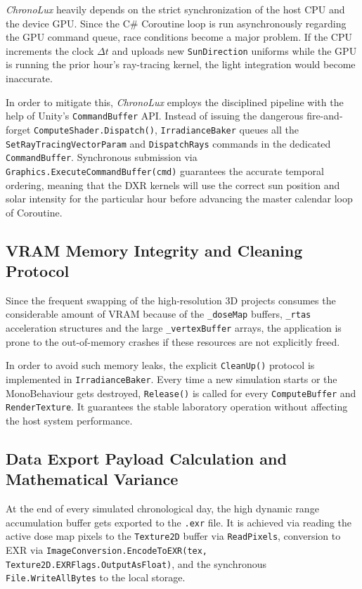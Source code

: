 \textit{ChronoLux} heavily depends on the strict synchronization of the host CPU and the device GPU. Since the C\# Coroutine loop is run asynchronously regarding the GPU command queue, race conditions become a major problem. If the CPU increments the clock $\Delta t$ and uploads new \texttt{SunDirection} uniforms while the GPU is running the prior hour's ray-tracing kernel, the light integration would become inaccurate.

In order to mitigate this, \textit{ChronoLux} employs the disciplined pipeline with the help of Unity's \texttt{CommandBuffer} API. Instead of issuing the dangerous fire-and-forget \texttt{ComputeShader.Dispatch()}, \texttt{IrradianceBaker} queues all the \texttt{SetRayTracingVectorParam} and \texttt{DispatchRays} commands in the dedicated \texttt{CommandBuffer}. Synchronous submission via \texttt{Graphics.ExecuteCommandBuffer(cmd)} guarantees the accurate temporal ordering, meaning that the DXR kernels will use the correct sun position and solar intensity for the particular hour before advancing the master calendar loop of Coroutine.

\subsection{VRAM Memory Integrity and Cleaning Protocol}

Since the frequent swapping of the high-resolution 3D projects consumes the considerable amount of VRAM because of the \texttt{\_doseMap} buffers, \texttt{\_rtas} acceleration structures and the large \texttt{\_vertexBuffer} arrays, the application is prone to the out-of-memory crashes if these resources are not explicitly freed.

In order to avoid such memory leaks, the explicit \texttt{CleanUp()} protocol is implemented in \texttt{IrradianceBaker}. Every time a new simulation starts or the MonoBehaviour gets destroyed, \texttt{Release()} is called for every \texttt{ComputeBuffer} and \texttt{RenderTexture}. It guarantees the stable laboratory operation without affecting the host system performance.

\subsection{Data Export Payload Calculation and Mathematical Variance}

At the end of every simulated chronological day, the high dynamic range accumulation buffer gets exported to the \texttt{.exr} file. It is achieved via reading the active dose map pixels to the \texttt{Texture2D} buffer via \texttt{ReadPixels}, conversion to EXR via \texttt{ImageConversion.EncodeToEXR(tex, Texture2D.EXRFlags.OutputAsFloat)}, and the synchronous \texttt{File.WriteAllBytes} to the local storage.

